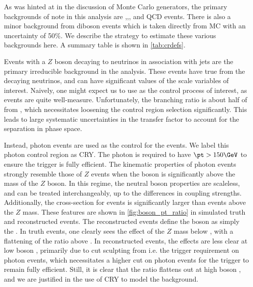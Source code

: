 As was hinted at in the discussion of Monte Carlo generators, the primary backgrounds of note in this analysis are \zjets,\wjets,\ttbar, and QCD events.
There is also a minor background from diboson events which is taken directly from MC with an uncertainty of 50\%.
We describe the strategy to estimate these various backgrounds here.
A summary table is shown in \ref{tab:crdefs}.


Events with a $Z$ boson decaying to neutrinos in association with jets are the primary irreducible background in the analysis.
These events have true \met from the decaying neutrinos, and can have significant values of the scale variables of interest.
Naively, one might expect us to use \Zll as the control process of interest, as \Zll events are quite well-measure.
Unfortunately, the \Zll branching ratio is about half of from \Zvv, which necessitates loosening the control region selection significantly.
This leads to large systematic uncertainties in the transfer factor to account for the separation in phase space.

Instead, photon events are used as the control for the \Zvv events.
We label this photon control region as CRY.
The photon is required to have $\pt > 150 \GeV$ to ensure the trigger is fully efficient.
The kinematic properties of photon events strongly resemble those of $Z$ events when the boson \pt is significantly above the mass of the $Z$ boson.
In this regime, the neutral boson properties are scaleless, and can be treated interchangeably, up to the differences in coupling strengths.
Additionally, the cross-section for \gammajets events is significantly larger than \zjets events above the $Z$ mass.
These features are shown in \ref{fig:boson_pt_ratio} in simulated \Zvv truth and reconstructed events.
The reconstructed \Zvv events define the boson \pt as simply the \met.
In truth events, one clearly sees the effect of the $Z$ mass below  \GeV, with a flattening of the ratio above  \GeV.
In reconstructed events, the effects are less clear at low boson \pt, primarily due to cut sculpting from i.e. the trigger requirement on photon events, which necessitates a higher \pt cut on photon events for the trigger to remain fully efficient.
Still, it is clear that the ratio flattens out at high boson \pt, and we are justified in the use of CRY to model the \zjets background.

